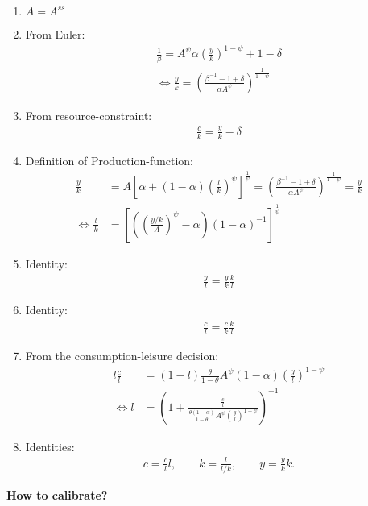 \documentclass{article}
\begin{document}
\begin{enumerate}
  \item $A = A^{ss}$
  \item From Euler: \begin{align*}
  \frac{1}{\beta}=A^\psi \alpha \left(\frac{y}{k}\right)^{1-\psi}+1-\delta \\
  \Leftrightarrow \frac{y}{k}=\left(\frac{\beta^{-1}-1+\delta}{\alpha A^\psi}\right)^\frac{1}{1-\psi}
  \end{align*}
  \item From resource-constraint: \begin{align*}\frac{c}{k}= \frac{y}{k}-\delta\end{align*}
  \item Definition of Production-function:
  \begin{align*}
    \frac{y}{k} &= A \left[\alpha + (1-\alpha)\left(\frac{l}{k}\right)^\psi\right]^\frac{1}{\psi}=\left(\frac{\beta^{-1}-1+\delta}{\alpha A^\psi}\right)^\frac{1}{1-\psi} =\frac{y}{k}\\
    \Leftrightarrow \frac{l}{k} &= \left[\left(\left(\frac{y/k}{A}\right)^\psi -\alpha\right)(1-\alpha)^{-1}\right]^\frac{1}{\psi}
  \end{align*}
  \item Identity:
  \begin{align*}
  \frac{y}{l}=\frac{y}{k}\frac{k}{l}
  \end{align*}
    \item Identity:
  \begin{align*}
  \frac{c}{l}=\frac{c}{k}\frac{k}{l}
  \end{align*}
  \item From the consumption-leisure decision:
  \begin{align*}
    l\frac{c}{l} &= (1-l)\frac{\theta}{1-\theta} A^\psi(1-\alpha)\left(\frac{y}{l}\right)^{1-\psi}\\
    \Leftrightarrow l &= \left(1+\frac{\frac{c}{l}}{\frac{\theta(1-\alpha)}{1-\theta} A^\psi \left(\frac{y}{l}\right)^{1-\psi}}\right)^{-1}
  \end{align*}
    \item Identities:
  \begin{align*}
  c=\frac{c}{l}l, \qquad  k=\frac{l}{l/k}, \qquad   y=\frac{y}{k}k.
  \end{align*}
\end{enumerate}
\textbf{How to calibrate?}
\end{document}
